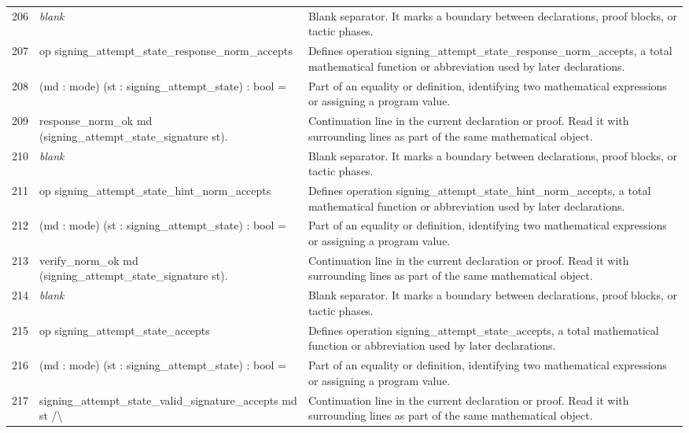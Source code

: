 \documentclass[10pt]{article}
\begin{document}
\begin{longtable}{r L{0.53\textwidth} L{0.37\textwidth}}
206 & {\ttfamily\scriptsize \emph{blank}} & Blank separator.  It marks a boundary between declarations, proof blocks, or tactic phases. \\
207 & {\ttfamily\scriptsize op signing\_attempt\_state\_response\_norm\_accepts} & Defines operation signing\_attempt\_state\_response\_norm\_accepts, a total mathematical function or abbreviation used by later declarations. \\
208 & {\ttfamily\scriptsize    (md : mode) (st : signing\_attempt\_state) : bool =} & Part of an equality or definition, identifying two mathematical expressions or assigning a program value. \\
209 & {\ttfamily\scriptsize   response\_norm\_ok md (signing\_attempt\_state\_signature st).} & Continuation line in the current declaration or proof.  Read it with surrounding lines as part of the same mathematical object. \\
210 & {\ttfamily\scriptsize \emph{blank}} & Blank separator.  It marks a boundary between declarations, proof blocks, or tactic phases. \\
211 & {\ttfamily\scriptsize op signing\_attempt\_state\_hint\_norm\_accepts} & Defines operation signing\_attempt\_state\_hint\_norm\_accepts, a total mathematical function or abbreviation used by later declarations. \\
212 & {\ttfamily\scriptsize    (md : mode) (st : signing\_attempt\_state) : bool =} & Part of an equality or definition, identifying two mathematical expressions or assigning a program value. \\
213 & {\ttfamily\scriptsize   verify\_norm\_ok md (signing\_attempt\_state\_signature st).} & Continuation line in the current declaration or proof.  Read it with surrounding lines as part of the same mathematical object. \\
214 & {\ttfamily\scriptsize \emph{blank}} & Blank separator.  It marks a boundary between declarations, proof blocks, or tactic phases. \\
215 & {\ttfamily\scriptsize op signing\_attempt\_state\_accepts} & Defines operation signing\_attempt\_state\_accepts, a total mathematical function or abbreviation used by later declarations. \\
216 & {\ttfamily\scriptsize    (md : mode) (st : signing\_attempt\_state) : bool =} & Part of an equality or definition, identifying two mathematical expressions or assigning a program value. \\
217 & {\ttfamily\scriptsize   signing\_attempt\_state\_valid\_signature\_accepts md st /\textbackslash{}} & Continuation line in the current declaration or proof.  Read it with surrounding lines as part of the same mathematical object. \\

\end{longtable}
\end{document}
